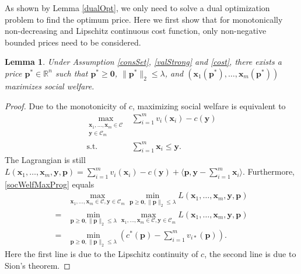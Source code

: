 \documentclass{article}
\newtheorem{lemma}{Lemma}[section]
\begin{document}
As shown by Lemma \ref{dualOpt}, we only need to solve a dual optimization problem to find the optimum price. Here we first show that for monotonically non-decreasing and Lipschitz continuous cost function, only non-negative bounded prices need to be considered.
\begin{lemma}\label{offlineOptPrice}
    Under Assumption \ref{consSet}, \ref{valStrong} and \ref{cost}, there exists a price $\mathbf{p}^*\in \mathbb{R}^n$ such that $\mathbf{p}^*\ge \mathbf{0}$, $\|\mathbf{p}^*\|_2\le\lambda$, and $(\mathbf{x}_1(\mathbf{p}^*),\ldots,\mathbf{x}_m(\mathbf{p}^*))$ maximizes social welfare.
\end{lemma}
\begin{proof}
    Due to the monotonicity of $c$, maximizing social welfare is equivalent to
    \begin{equation}\label{socWelfMaxProg}
        \begin{array}{rl}
            \displaystyle\max_{\substack{\mathbf{x}_1,\ldots,\mathbf{x}_m\in \mathcal{C}\\\mathbf{y}\in \mathcal{C}_m}} & \sum_{i=1}^{m}v_i(\mathbf{x}_i)-c(\mathbf{y}) \\
            \mathrm{s.t.} & \sum_{i=1}^{m}\mathbf{x}_i\le \mathbf{y}.
        \end{array}
    \end{equation}
    The Lagrangian is still $L(\mathbf{x}_1,\ldots,\mathbf{x}_m,\mathbf{y},\mathbf{p})=\sum_{i=1}^{m}v_i(\mathbf{x}_i)-c(\mathbf{y})+\langle \mathbf{p},\mathbf{y}-\sum_{i=1}^{m}\mathbf{x}_i\rangle$. Furthermore, \eqref{socWelfMaxProg} equals
    \begin{equation}
        \begin{array}{cl}
             & \max_{\mathbf{x}_1,\ldots,\mathbf{x}_m\in \mathcal{C},\mathbf{y}\in \mathcal{C}_m}\min_{\mathbf{p}\ge \mathbf{0},\|\mathbf{p}\|_2\le\lambda}L(\mathbf{x}_1,\ldots,\mathbf{x}_m,\mathbf{y},\mathbf{p}) \\
            = & \min_{\mathbf{p}\ge \mathbf{0},\|\mathbf{p}\|_2\le\lambda}\max_{\mathbf{x}_1,\ldots,\mathbf{x}_m\in \mathcal{C},\mathbf{y}\in \mathcal{C}_m}L(\mathbf{x}_1,\ldots,\mathbf{x}_m,\mathbf{y},\mathbf{p}) \\
            = & \min_{\mathbf{p}\ge \mathbf{0},\|\mathbf{p}\|_2\le\lambda}(c^*(\mathbf{p})-\sum_{i=1}^{m}v_{i*}(\mathbf{p})).
        \end{array}
    \end{equation}
    Here the first line is due to the Lipschitz continuity of $c$, the second line is due to Sion's theorem.


\end{proof}
\end{document}
